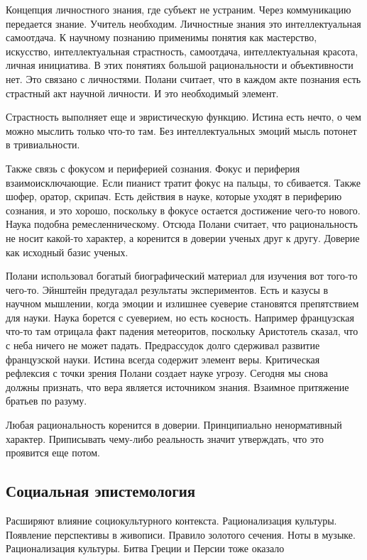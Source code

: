 \documentclass[a4paper, 12pt]{article}
\begin{document}
Концепция личностного знания, где субъект не устраним. Через 
коммуникацию передается знание. Учитель необходим. Личностные знания это 
интеллектуальная самоотдача. К научному познанию применимы понятия как 
мастерство, искусство, интеллектуальная страстность, самоотдача, 
интеллектуальная красота, личная инициатива. В этих понятиях большой 
рациональности и объективности нет. Это связано с личностями. Полани 
считает, что в каждом акте познания есть страстный акт научной личности. 
И это необходимый элемент.

Страстность выполняет еще и эвристическую функцию. Истина есть нечто, 
о чем можно мыслить только что-то там. Без интеллектуальных эмоций мысль 
потонет в тривиальности.

Также связь с фокусом и периферией сознания. Фокус и периферия 
взаимоисключающие. Если пианист тратит фокус на пальцы, то сбивается. 
Также шофер, оратор, скрипач. Есть действия в науке, которые уходят 
в периферию сознания, и это хорошо, поскольку в фокусе остается 
достижение чего-то нового. Наука подобна ремесленническому. Отсюда 
Полани считает, что рациональность не носит какой-то характер, 
а коренится в доверии ученых друг к другу. Доверие как исходный базис 
ученых.

Полани использовал богатый биографический материал для изучения вот 
того-то чего-то. Эйнштейн предугадал результаты экспериментов. Есть 
и казусы в научном мышлении, когда эмоции и излишнее суеверие становятся 
препятствием для науки. Наука борется с суеверием, но есть косность. 
Например французская что-то там отрицала факт падения метеоритов, 
поскольку Аристотель сказал, что с неба ничего не может падать. 
Предрассудок долго сдерживал развитие французской науки. Истина всегда 
содержит элемент веры. Критическая рефлексия с точки зрения Полани 
создает науке угрозу. Сегодня мы снова должны признать, что вера 
является источником знания. Взаимное притяжение братьев по разуму.

Любая рациональность коренится в доверии. Принципиально ненормативный 
характер. Приписывать чему-либо реальность значит утверждать, что это 
проявится еще потом.



\subsection{Социальная эпистемология}

Расширяют влияние социокультурного контекста. Рационализация культуры. 
Появление перспективы в живописи. Правило золотого сечения. Ноты 
в музыке. Рационализация культуры. Битва Греции и Персии тоже оказало
\end{document}
